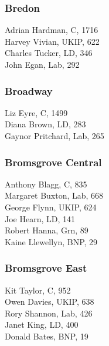 \documentclass[a4paper,openany,10pt]{book}
\begin{document}
\subsubsection*{Bredon}



Adrian Hardman, C, 1716\\
Harvey Vivian, UKIP, 622\\
Charles Tucker, LD, 346\\
John Egan, Lab, 292\\


\subsubsection*{Broadway}



Liz Eyre, C, 1499\\
Diana Brown, LD, 283\\
Gaynor Pritchard, Lab, 265\\


\subsubsection*{Bromsgrove Central}



Anthony Blagg, C, 835\\
Margaret Buxton, Lab, 668\\
George Flynn, UKIP, 624\\
Joe Hearn, LD, 141\\
Robert Hanna, Grn, 89\\
Kaine Llewellyn, BNP, 29\\


\subsubsection*{Bromsgrove East}



Kit Taylor, C, 952\\
Owen Davies, UKIP, 638\\
Rory Shannon, Lab, 426\\
Janet King, LD, 400\\
Donald Bates, BNP, 19\\
\end{document}
